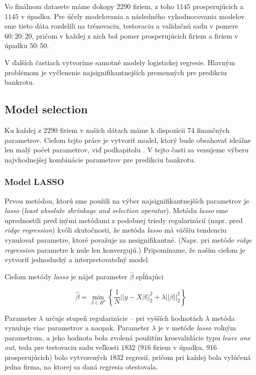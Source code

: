 Vo finálnom datasete máme dokopy \(2290\) firiem, z toho \(1145\) prosperujúcich a \(1145\) v úpadku.
Pre účely modelovania a následného vyhodnocovania modelov sme tieto dáta rozdelili na trénovaciu, testovaciu a validačnú sadu v pomere \(60:20:20\),
pričom v každej z nich bol pomer prosperujúcich firiem a firiem v úpadku \(50:50\).

V ďalších častiach vytvoríme samotné modely logistickej regresie. Hlavným problémom je vyčlenenie najsignifikantnejších premenných pre predikciu bankrotu.

\subsection{Model selection}

Ku každej z \(2290\) firiem v našich dátach máme k dispozícii \(74\) finančných parametrov.
Cieľom tejto práce je vytvoriť model, ktorý bude obsahovať ideálne len malý počet parametrov, viď podkapitolu \cite{model interpretability}.
V tejto časti sa venujeme výberu najvhodnejšej kombinácie parametrov pre predikciu bankrotu.

\subsubsection{Model LASSO}

Prvou metódou, ktorú sme použili na výber najsignifikantnejších parametrov je \emph{lasso} (\emph{least absolute shrinkage and selection operator}).
Metódu \emph{lasso} sme uprednostili pred inými metódami z podobnej triedy regularizácií (napr. pred \emph{ridge regression}) kvôli skutočnosti,
že metóda \emph{lasso} má väčšiu tendenciu vynulovať parametre, ktoré považuje za nesignifikantné.
(Napr. pri metóde \emph{ridge regression} parametre k nule len konvergujú.)
Pripomíname, že naším cieľom je vytvoriť jednoduchý a interpretovateľný model.

Cieľom metódy \emph{lasso} je nájsť parameter \(\hat{\beta}\) spĺňajúci

\[
    \hat{\beta} = \min_{\beta \in R^p} \left\{ \frac{1}{N} ||y - X \beta||_2^2 + \lambda || \beta ||_2^2 \right\}
\]

Parameter \(\lambda\) určuje stupeň regularizácie – pri vyšších hodnotách \(\lambda\) metóda vynuluje viac parametrov a naopak.
Parameter \(\lambda\) je v metóde \emph{lasso} voľným parametrom, a jeho hodnota bola zvolená použitím krosvalidácie typu \emph{leave one out},
teda pre testovaciu sadu veľkosti \(1832\) (\(916\) firiem v úpadku, \(916\) prosperujúcich) bolo vytvorených \(1832\) regresií,
pričom pri každej bola vylúčená jedna firma, na ktorej sa daná regresia otestovala.

